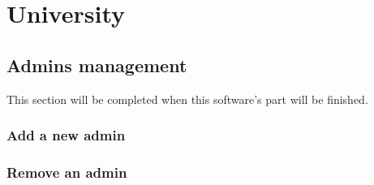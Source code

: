\documentclass[ManualeUtente]{subfiles}
\begin{document}
\chapter{University}
\section{Admins management}
This section will be completed when this software's part will be finished.
\subsection{Add a new admin}
\subsection{Remove an admin}
\end{document}

